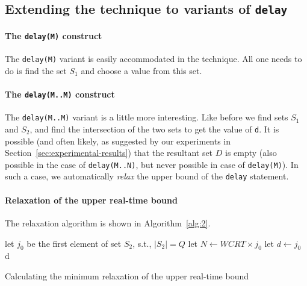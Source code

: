 \subsection{Extending the technique to variants of \texttt{delay}}
\label{sec:extend-tehcn-vari}

\paragraph{The \texttt{delay(M)} construct}
\label{sec:extend-techn-vari}

The \texttt{delay(M)} variant is easily accommodated in the
technique. All one needs to do is find the set $S_1$ and choose a value
from this set.

\paragraph{The \texttt{delay(M..M)} construct}
\label{sec:extend-techn-vari}

The \texttt{delay(M..M)} variant is a little more interesting. Like
before we find sets $S_1$ and $S_2$, and find the intersection of the
two sets to get the value of \texttt{d}. It is possible (and often
likely, as suggested by our experiments in
Section~\ref{sec:experimental-results}) that the resultant set $D$ is
empty (also possible in the case of \texttt{delay(M..N)}, but never
possible in case of \texttt{delay(M)}). In such a case, we automatically
\textit{relax} the upper bound of the \texttt{delay} statement.

\paragraph{Relaxation of the upper real-time bound}
\label{sec:over-appr-relax}

The relaxation algorithm is shown in Algorithm~\ref{alg:2}.
  
\begin{algorithm}[t!]
  \begin{minipage}{1.0\linewidth}
    \SetAlgoLined
     {
      let $j_{0}$ be the first element of set $S_2$, s.t., $|S_2|=Q$\;
      \ShowLn let $N \leftarrow WCRT \times j_0$\;
      let $d \leftarrow j_0$\;
    }
    \Return d\;
    \caption{Calculating the minimum relaxation of the upper real-time
      bound}
    \label{alg:2}
  \end{minipage}
\end{algorithm}


